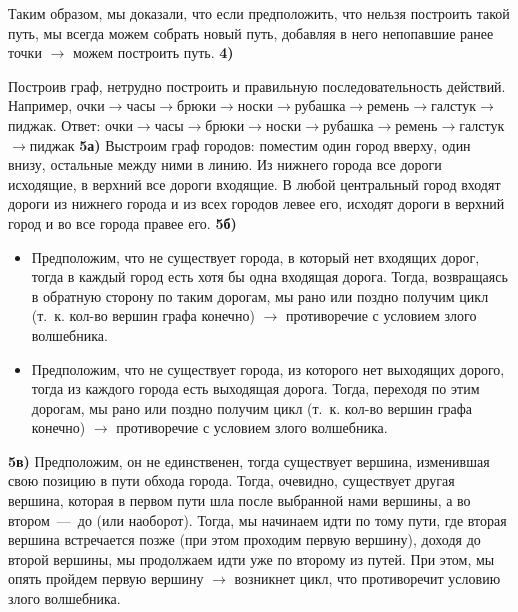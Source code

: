 \documentclass[12pt,a4paper,fleqn]{article}
\begin{document}
Таким образом, мы доказали, что если предположить, что нельзя построить такой путь, мы всегда можем собрать новый путь, добавляя в него непопавшие ранее точки $\rightarrow$ можем построить путь.	\newline
{\bf 4)} \newline
{} \newline
Построив граф, нетрудно построить и правильную последовательность действий. \newline 
Например, очки$\rightarrow$часы$\rightarrow$брюки$\rightarrow$носки$\rightarrow$рубашка$\rightarrow$ремень$\rightarrow$галстук$\rightarrow$пиджак. \newline
Ответ: очки$\rightarrow$часы$\rightarrow$брюки$\rightarrow$носки$\rightarrow$рубашка$\rightarrow$ремень$\rightarrow$галстук$\rightarrow$пиджак \newline
{\bf 5а)} Выстроим граф городов: поместим один город вверху, один внизу, остальные между ними в линию. Из нижнего города все дороги исходящие, в верхний все дороги входящие. В любой центральный город входят дороги из нижнего города и из всех городов левее его, исходят дороги в верхний город и во все города правее его. \newline
{\bf 5б)}
\begin{itemize}
\item Предположим, что не существует города, в который нет входящих дорог, тогда в каждый город есть хотя бы одна входящая дорога. Тогда, возвращаясь в обратную сторону по таким дорогам, мы рано или поздно получим цикл (т.~к. кол-во вершин графа конечно) $\rightarrow$ противоречие с условием злого волшебника.
\item Предположим, что не существует города, из которого нет выходящих дорого, тогда из каждого города есть выходящая дорога. Тогда, переходя по этим дорогам, мы рано или поздно получим цикл (т.~к. кол-во вершин графа конечно) $\rightarrow$ противоречие с условием злого волшебника.
\end{itemize} 
{\bf 5в)} Предположим, он не единственен, тогда существует вершина, изменившая свою позицию в пути обхода города. Тогда, очевидно, существует другая вершина, которая в первом пути шла после выбранной нами вершины, а во втором~---~до (или наоборот). Тогда, мы начинаем идти по тому пути, где вторая вершина встречается позже (при этом проходим первую вершину), доходя до второй вершины, мы продолжаем идти уже по второму из путей. При этом, мы опять пройдем первую вершину
$\rightarrow$ возникнет цикл, что противоречит условию злого волшебника.
\end{document}
